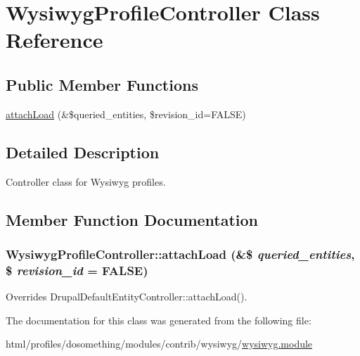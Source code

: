 \hypertarget{classWysiwygProfileController}{
\section{WysiwygProfileController Class Reference}
\label{classWysiwygProfileController}
}
\subsection*{Public Member Functions}
\begin{DoxyCompactItemize}
\item 
\hyperlink{classWysiwygProfileController_a0a4f9e5386dd5e410f77ac21509cd13b}{attachLoad} (\&\$queried\_\-entities, \$revision\_\-id=FALSE)
\end{DoxyCompactItemize}


\subsection{Detailed Description}
Controller class for Wysiwyg profiles. 

\subsection{Member Function Documentation}
\hypertarget{classWysiwygProfileController_a0a4f9e5386dd5e410f77ac21509cd13b}{
\subsubsection[{attachLoad}]{\setlength{\rightskip}{0pt plus 5cm}WysiwygProfileController::attachLoad (\&\$ {\em queried\_\-entities}, \/  \$ {\em revision\_\-id} = {\ttfamily FALSE})}}
\label{classWysiwygProfileController_a0a4f9e5386dd5e410f77ac21509cd13b}
Overrides DrupalDefaultEntityController::attachLoad(). 

The documentation for this class was generated from the following file:\begin{DoxyCompactItemize}
\item 
html/profiles/dosomething/modules/contrib/wysiwyg/\hyperlink{wysiwyg_8module}{wysiwyg.module}\end{DoxyCompactItemize}
